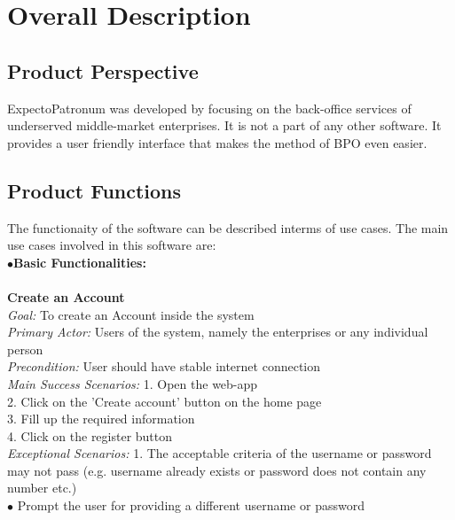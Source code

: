 \documentclass{scrreprt}
\begin{document}
\chapter{Overall Description}

\section{Product Perspective}
ExpectoPatronum was developed by focusing on the back-office services of
underserved middle-market enterprises. It is not a part of any other software. It
provides a user friendly interface that makes the method of BPO even easier.


\section{Product Functions}
The functionaity of the software can be described interms of use cases. The main use cases involved
in this software are:\\
$\bullet$\textbf{Basic Functionalities: }\\\\
 \textbf{Create an Account}\\
\textit{Goal: } To create an Account inside the system\\
\textit{Primary Actor: } Users of the system, namely the enterprises or any individual person\\
\textit{Precondition: }User should have stable internet connection\\
\textit{Main Success Scenarios: }1. Open the web-app\\
2. Click on the 'Create account' button on the home page\\
3. Fill up the required information\\
4. Click on the register button\\
\textit{Exceptional Scenarios: }1. The acceptable criteria of the username or password may not pass (e.g. username already exists or password does not contain any number etc.)\\
$\bullet$ Prompt the user for providing a different username or password\\\\
\end{document}

